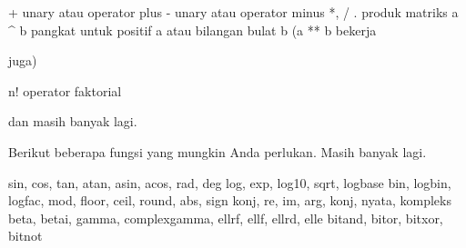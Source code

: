 \documentclass[12pt,Times new roman,letterpaper]{book}
\begin{document}
\begin{eulernootebook}
\begin{eulercomment}
\begin{eulercomment}
\begin{eulernootebook}
\begin{eulercomment}
\end{eulercomment}
\begin{eulerttcomment}
 + unary atau operator plus
 - unary atau operator minus
 *, /
 . produk matriks
 a ^ b pangkat untuk positif a atau bilangan bulat b (a ** b bekerja
\end{eulerttcomment}
\begin{eulercomment}
juga)\\
\end{eulercomment}
\begin{eulerttcomment}
 n! operator faktorial
\end{eulerttcomment}
\begin{eulercomment}

dan masih banyak lagi.

Berikut beberapa fungsi yang mungkin Anda perlukan. Masih banyak lagi.

\end{eulercomment}
\begin{eulerttcomment}
 sin, cos, tan, atan, asin, acos, rad, deg
 log, exp, log10, sqrt, logbase
 bin, logbin, logfac, mod, floor, ceil, round, abs, sign
 konj, re, im, arg, konj, nyata, kompleks
 beta, betai, gamma, complexgamma, ellrf, ellf, ellrd, elle
 bitand, bitor, bitxor, bitnot
\end{eulerttcomment}
\begin{eulercomment}


\end{eulercomment}
\end{eulernootebook}
\end{eulercomment}
\end{eulercomment}
\end{eulernootebook}
\end{document}

